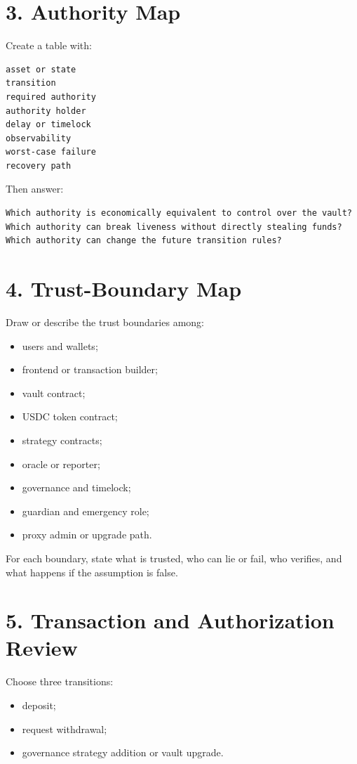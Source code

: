 \section*{3. Authority Map}

Create a table with:

\begin{lstlisting}
asset or state
transition
required authority
authority holder
delay or timelock
observability
worst-case failure
recovery path
\end{lstlisting}

Then answer:

\begin{lstlisting}
Which authority is economically equivalent to control over the vault?
Which authority can break liveness without directly stealing funds?
Which authority can change the future transition rules?
\end{lstlisting}

\section*{4. Trust-Boundary Map}

Draw or describe the trust boundaries among:

\begin{itemize}
\tightlist
\item
  users and wallets;
\item
  frontend or transaction builder;
\item
  vault contract;
\item
  USDC token contract;
\item
  strategy contracts;
\item
  oracle or reporter;
\item
  governance and timelock;
\item
  guardian and emergency role;
\item
  proxy admin or upgrade path.
\end{itemize}

For each boundary, state what is trusted, who can lie or fail, who verifies, and what happens if the assumption is false.

\section*{5. Transaction and Authorization Review}

Choose three transitions:

\begin{itemize}
\tightlist
\item
  deposit;
\item
  request withdrawal;
\item
  governance strategy addition or vault upgrade.
\end{itemize}

